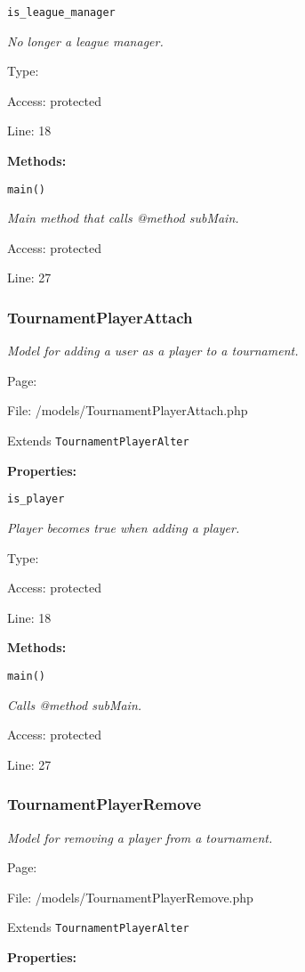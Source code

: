 \texttt{is\_league\_manager}

{\scriptsize
\textit{No longer a league manager.}

Type: 

Access: protected

Line: 18

}
\textbf{Methods:}

\texttt{main()}

{\scriptsize
\textit{Main method that calls @method subMain.}

Access: protected

Line: 27

}

\subsubsection{TournamentPlayerAttach}\label{TournamentPlayerAttach.php.doc}
\textit{Model for adding a user as a player to a tournament.}

Page: \pageref{TournamentPlayerAttach.php}

File: /models/TournamentPlayerAttach.php

Extends \texttt{TournamentPlayerAlter}

\textbf{Properties:}

\texttt{is\_player}

{\scriptsize
\textit{Player becomes true when adding a player.}

Type: 

Access: protected

Line: 18

}
\textbf{Methods:}

\texttt{main()}

{\scriptsize
\textit{Calls @method subMain.}

Access: protected

Line: 27

}

\subsubsection{TournamentPlayerRemove}\label{TournamentPlayerRemove.php.doc}
\textit{Model for removing a player from a tournament.}

Page: \pageref{TournamentPlayerRemove.php}

File: /models/TournamentPlayerRemove.php

Extends \texttt{TournamentPlayerAlter}

\textbf{Properties:}

